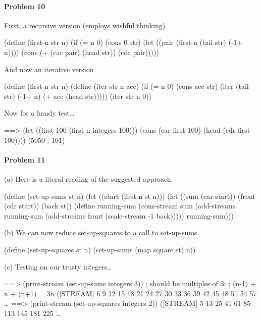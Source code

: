 \paragraph{Problem 10}

First, a recursive version (employs wishful thinking)

\beginlisp
(define (first-n str n)
  (if (= n 0)
      (cons 0 str)
      (let ((pair (first-n (tail str) (-1+ n))))
        (cons (+ (car pair) (head str))
              (cdr pair)))))
\endlisp

And now an iterative version

\beginlisp
(define (first-n str n)
  (define (iter str n acc)
    (if (= n 0)
        (cons acc str)
        (iter (tail str) (-1+ n) (+ acc (head str)))))
  (iter str n 0))
\endlisp

Now for a handy test\ldots

\beginlisp
==> (let ((first-100 (first-n integers 100)))
      (cons (car first-100) (head (cdr first-100))))
(5050 . 101)
\endlisp

\newpage

\paragraph{Problem 11}

(a) Here is a literal reading of the suggested approach.

\beginlisp
(define (set-up-sums st n)
  (let ((start (first-n st n)))
    (let ((sum   (car start))
          (front (cdr start))
          (back st))
     (define running-sum
       (cons-stream sum
                    (add-streams running-sum
                                 (add-streams front
                                              (scale-stream -1 back)))))
     running-sum)))
\endlisp

(b) We can now reduce {\cf set-up-squares} to a call to {\cf set-up-sums}.

\beginlisp
(define (set-up-squares st n)
  (set-up-sums (map square st) n))
\endlisp

(c) Testing on our trusty integers\ldots

\beginlisp
==> (print-stream (set-up-sums integers 3))  ; should be multiples of 3:
                                             ;  (n-1) + n + (n+1) = 3n
([STREAM] 6 9 12 15 18 21 24 27 30 33 36 39 42 45 48 51 54 57 \ldots
\null
==> (print-stream (set-up-squares integers 2))
([STREAM] 5 13 25 41 61 85 113 145 181 225 \ldots
\endlisp

